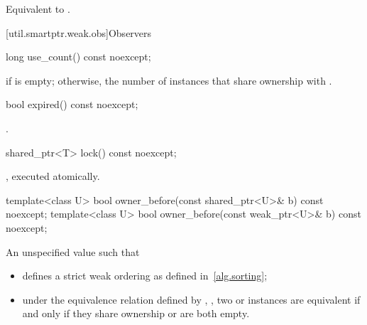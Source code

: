 \begin{itemdescr}
\pnum
\effects
Equivalent to .
\end{itemdescr}

[util.smartptr.weak.obs]{Observers}
%
\begin{itemdecl}
long use_count() const noexcept;
\end{itemdecl}

\begin{itemdescr}
\pnum
\returns
{} if  is empty;
otherwise, the number of  instances
that share ownership with .
\end{itemdescr}

%
\begin{itemdecl}
bool expired() const noexcept;
\end{itemdecl}

\begin{itemdescr}
\pnum
\returns
{}.
\end{itemdescr}

%
\begin{itemdecl}
shared_ptr<T> lock() const noexcept;
\end{itemdecl}

\begin{itemdescr}
\pnum
\returns
{}, executed atomically.
\end{itemdescr}

%
\begin{itemdecl}
template<class U> bool owner_before(const shared_ptr<U>& b) const noexcept;
template<class U> bool owner_before(const weak_ptr<U>& b) const noexcept;
\end{itemdecl}

\begin{itemdescr}
\pnum
\returns
An unspecified value such that
\begin{itemize}
\item {} defines a strict weak ordering as defined in~\ref{alg.sorting};

\item under the equivalence relation defined by ,
, two  or
 instances are equivalent if and only if they share ownership or are
both empty.
\end{itemize}
\end{itemdescr}


